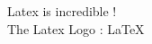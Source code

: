 \documentclass{article}
\begin{document}
Latex is incredible ! \\
The Latex Logo : \LaTeX  
\end{document}
